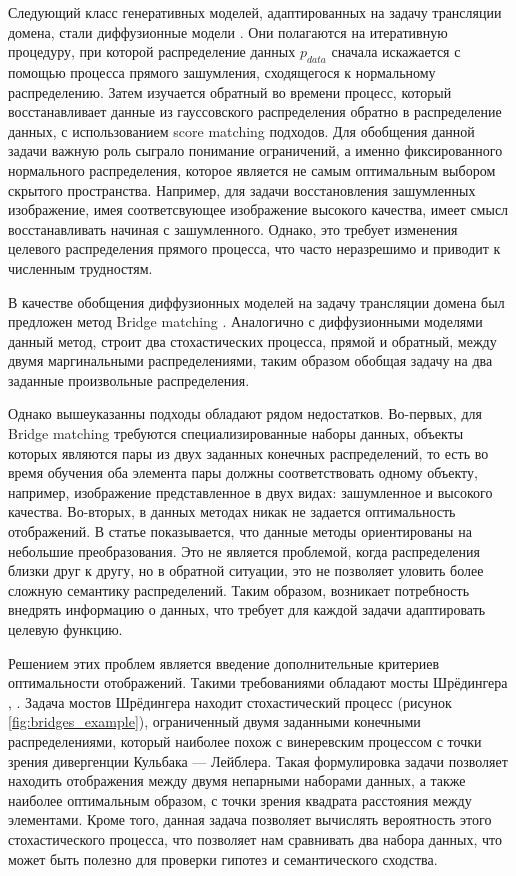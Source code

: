Следующий класс генеративных моделей, адаптированных на задачу трансляции домена, стали диффузионные модели \cite{ddpm}. Они полагаются на итеративную процедуру, при которой распределение данных $p_{data}$ сначала искажается с помощью процесса прямого зашумления, сходящегося к нормальному распределению. Затем изучается обратный во времени процесс, который восстанавливает данные из гауссовского распределения обратно в распределение данных, с использованием score matching подходов. Для обобщения данной задачи важную роль сыграло понимание ограничений, а именно фиксированного нормального распределения, которое является не самым оптимальным выбором скрытого пространства. Например, для задачи восстановления зашумленных изображение, имея соответсвующее изображение высокого качества, имеет смысл восстанавливать начиная с зашумленного. Однако, это требует изменения целевого распределения прямого процесса, что часто неразрешимо и приводит к численным трудностям. 

В качестве обобщения диффузионных моделей на задачу трансляции домена был предложен метод Bridge matching \cite{bridge-matching}. Аналогично с диффузионными моделями данный метод, строит два стохастических процесса, прямой и обратный, между двумя маргинальными распределениями, таким образом обобщая задачу на два заданные произвольные распределения.

Однако вышеуказанны подходы обладают рядом недостатков. Во-первых, для Bridge matching требуются специализированные наборы данных, объекты которых являются пары из двух заданных конечных распределений, то есть во время обучения оба элемента пары должны соответствовать одному объекту, например, изображение представленное в двух видах: зашумленное и высокого качества. Во-вторых, в данных методах никак не задается оптимальность отображений. В статье \cite{translation-optimality} показывается, что данные методы ориентированы на небольшие преобразования. Это не является проблемой, когда распределения близки друг к другу, но в обратной ситуации, это не позволяет уловить более сложную семантику распределений. Таким образом, возникает потребность внедрять информацию о данных, что требует для каждой задачи адаптировать целевую функцию. 

Решением этих проблем является введение дополнительные критериев оптимальности отображений. Такими требованиями обладают мосты Шрёдингера \cite{schrödinger}, \cite{leonard-survey}. Задача мостов Шрёдингера находит стохастический процесс (рисунок \ref{fig:bridges_example}), ограниченный двумя заданными конечными распределениями, который наиболее похож с винеревским процессом с точки зрения дивергенции Кульбака — Лейблера. Такая формулировка задачи позволяет находить отображения между двумя непарными наборами данных, а также наиболее оптимальным образом, с точки зрения квадрата расстояния между элементами. Кроме того, данная задача позволяет вычислять вероятность этого стохастического процесса, что позволяет нам сравнивать два набора данных, что может быть полезно для проверки гипотез и семантического сходства.

